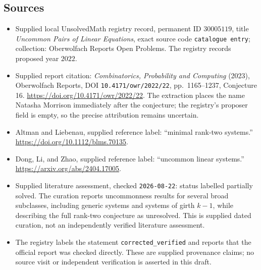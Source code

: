 \documentclass[11pt]{article}
\begin{document}
\subsection{Sources}
\begin{itemize}
\item Supplied local UnsolvedMath registry record, permanent ID \(30005119\), title \emph{Uncommon Pairs of Linear Equations}, exact source code \texttt{catalogue entry}; collection: Oberwolfach Reports Open Problems. The registry records proposed year \(2022\).
\item Supplied report citation: \emph{Combinatorics, Probability and Computing} (2023), Oberwolfach Reports, DOI \texttt{10.4171/owr/2022/22}, pp.\ 1165--1237, Conjecture 16. \url{https://doi.org/10.4171/owr/2022/22}. The extraction places the name Natasha Morrison immediately after the conjecture; the registry's proposer field is empty, so the precise attribution remains uncertain.
\item Altman and Liebenau, supplied reference label: ``minimal rank-two systems.'' \url{https://doi.org/10.1112/blms.70135}.
\item Dong, Li, and Zhao, supplied reference label: ``uncommon linear systems.'' \url{https://arxiv.org/abs/2404.17005}.
\item Supplied literature assessment, checked \texttt{2026-08-22}: status labelled partially solved. The curation reports uncommonness results for several broad subclasses, including generic systems and systems of girth \(k-1\), while describing the full rank-two conjecture as unresolved. This is supplied dated curation, not an independently verified literature assessment.
\item The registry labels the statement \texttt{corrected\_verified} and reports that the official report was checked directly. These are supplied provenance claims; no source visit or independent verification is asserted in this draft.
\end{itemize}
\end{document}
